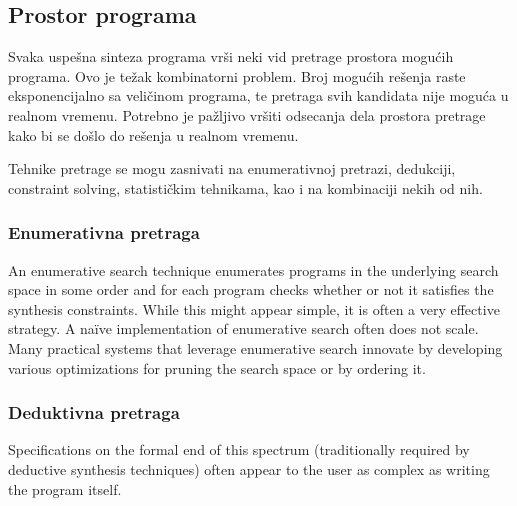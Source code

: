 \subsection{Prostor programa}
\label{subsec:SearchTechnique}

Svaka uspešna sinteza programa vrši neki vid pretrage prostora mogućih programa. Ovo je težak kombinatorni problem. Broj mogućih rešenja raste eksponencijalno sa veličinom programa, te pretraga svih kandidata nije moguća u realnom vremenu. Potrebno je pažljivo vršiti odsecanja dela prostora pretrage kako bi se došlo do rešenja u realnom vremenu.

Tehnike pretrage se mogu zasnivati na enumerativnoj pretrazi, dedukciji, constraint solving, statističkim tehnikama, kao i na kombinaciji nekih od nih.


\subsubsection{Enumerativna pretraga}
\label{subsubsec:Enumerative}

An enumerative search technique enumerates programs
in the underlying search space in some order and for each program
checks whether or not it satisfies the synthesis constraints. While this
might appear simple, it is often a very effective strategy. A naïve implementation
of enumerative search often does not scale. Many practical
systems that leverage enumerative search innovate by developing various
optimizations for pruning the search space or by ordering it.


\subsubsection{Deduktivna pretraga}
\label{subsubsec:Deductive}

Specifications on the formal end of this spectrum
(traditionally required by deductive synthesis techniques) often appear
to the user as complex as writing the program itself. 


